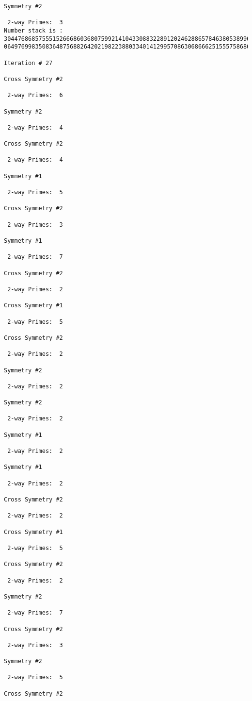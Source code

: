{{{{\begin{verbatim}
Symmetry #2

 2-way Primes: 	3
Number stack is :
30447686857555152666860368075992141043308832289120246288657846380538996794608835958544046240163340857
06497699835083648756882642021982238803340141299570863068666251555758686744037580433610426404458595388

Iteration #	27

Cross Symmetry #2

 2-way Primes: 	6

Symmetry #2

 2-way Primes: 	4

Cross Symmetry #2

 2-way Primes: 	4

Symmetry #1

 2-way Primes: 	5

Cross Symmetry #2

 2-way Primes: 	3

Symmetry #1

 2-way Primes: 	7

Cross Symmetry #2

 2-way Primes: 	2

Cross Symmetry #1

 2-way Primes: 	5

Cross Symmetry #2

 2-way Primes: 	2

Symmetry #2

 2-way Primes: 	2

Symmetry #2

 2-way Primes: 	2

Symmetry #1

 2-way Primes: 	2

Symmetry #1

 2-way Primes: 	2

Cross Symmetry #2

 2-way Primes: 	2

Cross Symmetry #1

 2-way Primes: 	5

Cross Symmetry #2

 2-way Primes: 	2

Symmetry #2

 2-way Primes: 	7

Cross Symmetry #2

 2-way Primes: 	3

Symmetry #2

 2-way Primes: 	5

Cross Symmetry #2


\end{verbatim}}}}}
